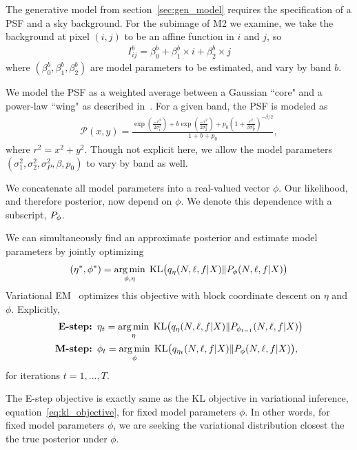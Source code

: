 The generative model from section~\ref{sec:gen_model} requires
the specification of a PSF and a sky background. 
For the subimage of M2 we examine, 
we take the background at pixel $(i, j)$ to be an affine function in $i$ and $j$, so 
\begin{align}
    I_{ij}^{b} = \beta_0^{b} + \beta_1^{b} \times i + \beta_2^{b} \times j
\end{align}
where $(\beta_0^{b}, \beta_1^{b}, \beta_2^{b})$ are model parameters to be estimated, and 
vary by band $b$. 


We model the PSF as a weighted average between a Gaussian ``core" and a power-law ``wing" as described in~\cite{Xin2018psf}. For a given band, the PSF is modeled as 
\begin{align}
    \mathcal{P}(x, y) = \frac{\exp(\frac{-r^2}{2\sigma_1^2}) + 
                            b \exp(\frac{-r^2}{2\sigma_2^2}) + 
                            p_0(1 + \frac{r^2}{\beta\sigma^2_P})^{-\beta/2} }{1 + b + p_0},
\end{align}
where $r^2 = x^2 + y^2$. Though not explicit here, we allow the model parameters 
$(\sigma_1^2, \sigma_2^2, \sigma_P^2, \beta, p_0)$ to vary by band as well. 

We concatenate all model parameters into a real-valued vector $\phi$. Our likelihood, and therefore posterior, now depend on $\phi$. We denote this dependence with a subscript, $P_\phi$. 

We can simultaneously find an approximate posterior and 
estimate model parameters by jointly optimizing 
\begin{align}
(\eta^*, \phi^*) = \operatorname*{arg\,min}_{\phi, \eta} \; \mathrm{KL}\big (q_{\eta}(N, \ell, f |X) \| P_{\phi}(N, \ell, f | X)\big)\label{eq:em_obj}
\end{align}
Variational EM~\cite{Jordan_intro_vi, neal2000varem, Beal2002varem} optimizes this objective with block coordinate descent on $\eta$ and $\phi$. Explicitly, 
\begin{align}
    \text{{\bf E-step: }} & 
    \eta_{t} = \operatorname*{arg\,min}_\eta \; \mathrm{KL}\big (q_{\eta    }(N, \ell, f |X) \| P_{\phi_{t - 1}}(N, \ell, f | X)\big)
    \label{eq:e_step}
    \\
    \text{{\bf M-step: }} & \phi_{t} = \operatorname*{arg\,min}_{\phi} \; \mathrm{KL}\big (q_{\eta_t}(N, \ell, f |X) \| P_{\phi}(N, \ell, f | X)\big), 
    \label{eq:m_step}
\end{align}
for iterations $t = 1, ..., T$. 

The E-step objective is exactly same as the KL objective in variational inference, equation~\ref{eq:kl_objective}, for fixed model parameters $\phi$. 
In other words, for fixed model parameters $\phi$, we are seeking the variational distribution closest the the true posterior under $\phi$. 

